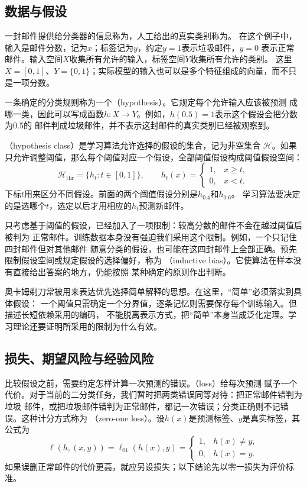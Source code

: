 \subsection{数据与假设}

一封邮件提供给分类器的信息称为，人工给出的真实类别称为。
在这个例子中，输入是邮件分数，记为$x$；标签记为$y$，约定$y=1$表示垃圾邮件，$y=0$
表示正常邮件。输入空间$X$收集所有允许的输入，标签空间$Y$收集所有允许的类别。
这里$X=[0,1]$、$Y=\{0,1\}$；实际模型的输入也可以是多个特征组成的向量，而不只是一项分数。

一条确定的分类规则称为一个（hypothesis）。它规定每个允许输入应该被预测
成哪一类，因此可以写成函数$h:X\to Y$。例如，$h(0.5)=1$表示这个假设会把分数为0.5的
邮件判成垃圾邮件，并不表示这封邮件的真实类别已经被观察到。

（hypothesis class）是学习算法允许选择的假设的集合，记为非空集合
$\mathcal H$。如果只允许调整阈值，那么每个阈值对应一个假设，全部阈值假设构成阈值假设空间：
\begin{equation}
 \mathcal H_{\mathrm{thr}}=\{h_t:t\in[0,1]\},\qquad
 h_t(x)=\begin{cases}
  1,&x\geq t,\\
  0,&x<t.
 \end{cases}
 \label{eq:threshold-hypothesis-class}
\end{equation}
下标$t$用来区分不同假设。前面的两个阈值假设分别是$h_{0.4}$和$h_{0.6}$。
学习算法要决定的是选哪个$t$，选定以后才用相应的$h_t$预测新邮件。

只考虑基于阈值的假设，已经加入了一项限制：较高分数的邮件不会在越过阈值后被判为
正常邮件。训练数据本身没有强迫我们采用这个限制。例如，一个只记住四封邮件但对其他邮件
随意分类的假设，也可能在这四封邮件上全部正确。预先限制假设空间或规定假设的选择偏好，称为
（inductive bias）。它使算法在样本没有直接给出答案的地方，仍能按照
某种确定的原则作出判断。

奥卡姆剃刀常被用来表达优先选择简单解释的思想。在这里，“简单”必须落实到具体假设：
一个阈值只需确定一个分界值，逐条记忆则需要保存每个训练输入。但描述长短依赖采用的编码，
不能脱离表示方式，把“简单”本身当成泛化定理。学习理论还要证明所采用的限制为什么有效。

\subsection{损失、期望风险与经验风险}

比较假设之前，需要约定怎样计算一次预测的错误。（loss）给每次预测
赋予一个代价。对于当前的二分类任务，我们暂时把两类错误同等对待：把正常邮件错判为垃圾
邮件，或把垃圾邮件错判为正常邮件，都记一次错误；分类正确则不记错误。这种计分方式称为
（zero-one loss）。设$h(x)$是预测标签、$y$是真实标签，其公式为
\begin{equation}
 \ell(h,(x,y))=\ell_{01}(h(x),y)=\begin{cases}
  1,&h(x)\neq y,\\
  0,&h(x)=y.
 \end{cases}
 \label{eq:zero-one-loss}
\end{equation}
如果误删正常邮件的代价更高，就应另设损失；以下结论先以零一损失为评价标准。

